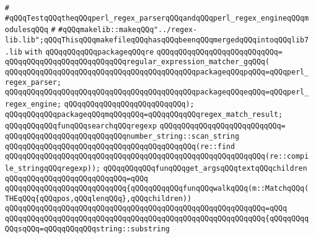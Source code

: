 \label{src/lib/regex/demo/demo.pkg}
\verb|#|\newline
\verb|#qQQqTestqQQqtheqQQqperl_regex_parserqQQqandqQQqperl_regex_engineqQQqmodulesqQQq|\newline
\verb|#|\newline
\newline
\verb|#qQQqmakelib::makeqQQq"../regex-lib.lib";qQQqThisqQQqmakefileqQQqhasqQQqbeenqQQqmergedqQQqintoqQQqlib7.lib|\newline
\newline
\verb|with|\newline
\verb|qQQqqQQqqQQqpackageqQQqre|\newline
\verb|qQQqqQQqqQQqqQQqqQQqqQQqqQQq=|\newline
\verb|qQQqqQQqqQQqqQQqqQQqqQQqqQQqregular_expression_matcher_gqQQq(|\newline
\verb|qQQqqQQqqQQqqQQqqQQqqQQqqQQqqQQqqQQqqQQqqQQqpackageqQQqpqQQq=qQQqperl_regex_parser;|\newline
\verb|qQQqqQQqqQQqqQQqqQQqqQQqqQQqqQQqqQQqqQQqqQQqpackageqQQqeqQQq=qQQqperl_regex_engine;|\newline
\verb|qQQqqQQqqQQqqQQqqQQqqQQqqQQq);|\newline
\newline
\verb|qQQqqQQqqQQqpackageqQQqmqQQqqQQq=qQQqqQQqqQQqregex_match_result;|\newline
\newline
\verb|qQQqqQQqqQQqfunqQQqsearchqQQqregexp|\newline
\verb|qQQqqQQqqQQqqQQqqQQqqQQqqQQq=|\newline
\verb|qQQqqQQqqQQqqQQqqQQqqQQqqQQqnumber_string::scan_string|\newline
\verb|qQQqqQQqqQQqqQQqqQQqqQQqqQQqqQQqqQQqqQQqqQQq(re::find|\newline
\verb|qQQqqQQqqQQqqQQqqQQqqQQqqQQqqQQqqQQqqQQqqQQqqQQqqQQqqQQqqQQq(re::compile_stringqQQqregexp));|\newline
\newline
\verb|qQQqqQQqqQQqfunqQQqget_argsqQQqtextqQQqchildren|\newline
\verb|qQQqqQQqqQQqqQQqqQQqqQQqqQQq=qQQq|\newline
\verb|qQQqqQQqqQQqqQQqqQQqqQQqqQQq{qQQqqQQqqQQqfunqQQqwalkqQQq(m::MatchqQQq(THEqQQq{qQQqpos,qQQqlenqQQq},qQQqchildren))|\newline
\verb|qQQqqQQqqQQqqQQqqQQqqQQqqQQqqQQqqQQqqQQqqQQqqQQqqQQqqQQqqQQq=qQQq|\newline
\verb|qQQqqQQqqQQqqQQqqQQqqQQqqQQqqQQqqQQqqQQqqQQqqQQqqQQqqQQqqQQq{qQQqqQQqqQQqsqQQq=qQQqqQQqqQQqstring::substring|\newline
